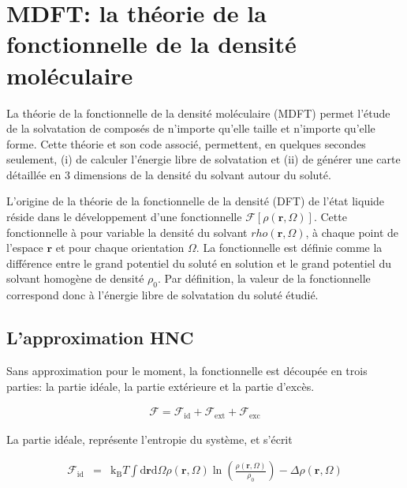 \chapter{MDFT: la théorie de la fonctionnelle de la densité moléculaire}



La théorie de la fonctionnelle de la densité moléculaire (MDFT) permet l'étude de la solvatation de composés de n'importe qu'elle taille et n'importe qu'elle forme. Cette théorie et son code associé, permettent, en quelques secondes seulement, (i) de calculer l'énergie libre de solvatation et (ii) de générer une carte détaillée en 3 dimensions de la densité du solvant autour du soluté.


L'origine de la théorie de la fonctionnelle de la densité (DFT) de l'état liquide réside dans le développement d'une fonctionnelle $\mathcal{F}[\rho\left(\boldsymbol{r},\Omega \right)]$. Cette fonctionnelle à pour variable la densité du solvant $rho\left(\boldsymbol{r},\Omega \right)$, à chaque point de l'espace $\boldsymbol{r}$ et pour chaque orientation $\Omega$. La fonctionnelle est définie comme la différence entre le grand potentiel du soluté en solution et le grand potentiel du solvant homogène de densité $\rho_{0}$. Par définition, la valeur de la fonctionnelle correspond donc à l'énergie libre de solvatation du soluté étudié. 

\section{L'approximation HNC}

Sans approximation pour le moment, la fonctionnelle est découpée en trois parties: la partie idéale, la partie extérieure et la partie d'excès\cite{evans_density_2009,henderson_fundamentals_1992}. 


\begin{eqnarray}
\mathcal{F} = \mathcal{F}_\mathrm{id} + \mathcal{F}_\mathrm{ext} + \mathcal{F}_\mathrm{exc}
\end{eqnarray}

La partie idéale, représente l’entropie du système, et s'écrit

\begin{eqnarray}
\mathcal{F}_\mathrm{id}&=&\mathrm{k_B}T\int\mathrm{d}\boldsymbol{r}\mathrm{d}\Omega \rho\left(\boldsymbol{r},\Omega \right)\ln\left(\frac{\rho\left(\boldsymbol{r},\Omega \right)}{\rho_0}\right)-\Delta\rho\left(\boldsymbol{r},\Omega \right)
\end{eqnarray}

